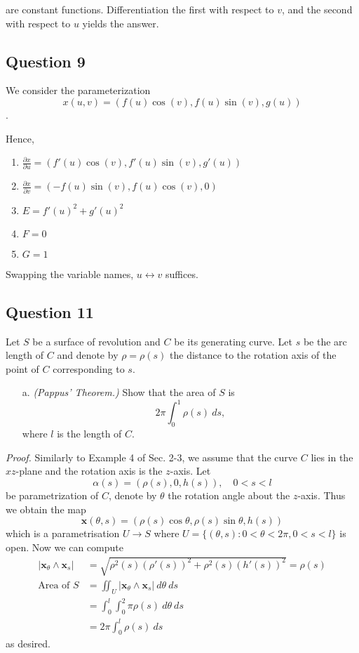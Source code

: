 \documentclass[12pt]{article}
\begin{document}
are constant functions. Differentiation the first with respect to $v$, and the second with respect to $u$ yields the answer.

\subsection*{Question 9}


We consider the parameterization 
$$x(u,v) = (f(u)\cos(v), f(u)\sin(v), g(u))$$.

Hence,

\begin{enumerate}
\item $\frac{ \partial x}{\partial u} = (f'(u)\cos(v), f'(u)\sin(v), g'(u))$ 
\item $\frac{ \partial x}{\partial v} = (-f(u)\sin(v), f(u)\cos(v), 0)$
\item $E = f'(u)^2 + g'(u)^2$
\item $F = 0$ 
\item $G = 1$
\end{enumerate}

Swapping the variable names, $u \leftrightarrow v$ suffices.

\subsection*{Question 11}

Let \(S\) be a surface of revolution and \(C\) be its generating curve.
Let \(s\) be the arc length of \(C\) and denote by \(\rho = \rho(s)\) the distance to the rotation axis of the point of \(C\) corresponding to \(s\).

\begin{enumerate}
    \item[a.] \emph{(Pappus' Theorem.)} Show that the area of \(S\) is \[ 2\pi \int_0^1 \rho(s)\ ds, \]
        where \(l\) is the length of \(C\).
\end{enumerate}

\emph{Proof.}
Similarly to Example 4 of Sec. 2-3, we assume that the curve \(C\) lies in the \(xz\)-plane and the rotation axis is the \(z\)-axis.
Let \[\alpha(s) = (\rho(s), 0, h(s)), \quad 0 < s < l\] be parametrization of \(C\),
denote by \(\theta\) the rotation angle about the \(z\)-axis. Thus we obtain the map
\[ \mathbf{x}(\theta,s) = (\rho(s) \cos \theta, \rho(s) \sin \theta, h(s)) \]
which is a parametrisation \(U \to S\)
where \(U = \{(\theta,s): 0 < \theta < 2\pi , 0 < s < l\}\) is open.
Now we can compute
\begin{align*}
    \left\lvert \mathbf{x}_\theta \land \mathbf{x}_s \right\rvert
    &= \sqrt{\rho^2(s) (\rho'(s))^2 + \rho^2(s) (h'(s))^2} = \rho(s) \\
    \text{Area of } S
    &= \iint_U \left\lvert \mathbf{x}_\theta \land \mathbf{x}_s \right\rvert\ d\theta\ ds \\
    &= \int_0^l \int_0^2\pi \rho(s)\ d\theta\ ds \\
    &= 2\pi \int_0^l \rho(s)\ ds
\end{align*}
as desired.
\end{document}
